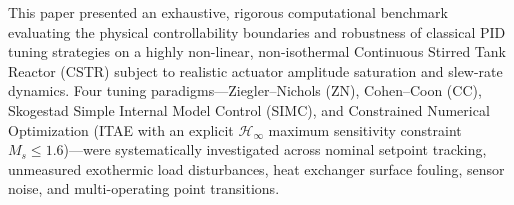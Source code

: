 
This paper presented an exhaustive, rigorous computational benchmark evaluating the physical controllability boundaries and robustness of classical PID tuning strategies on a highly non-linear, non-isothermal Continuous Stirred Tank Reactor (CSTR) subject to realistic actuator amplitude saturation and slew-rate dynamics. Four tuning paradigms—Ziegler--Nichols (ZN), Cohen--Coon (CC), Skogestad Simple Internal Model Control (SIMC), and Constrained Numerical Optimization (ITAE with an explicit $\mathcal{H}_\infty$ maximum sensitivity constraint $M_s \le 1.6$)—were systematically investigated across nominal setpoint tracking, unmeasured exothermic load disturbances, heat exchanger surface fouling, sensor noise, and multi-operating point transitions.

